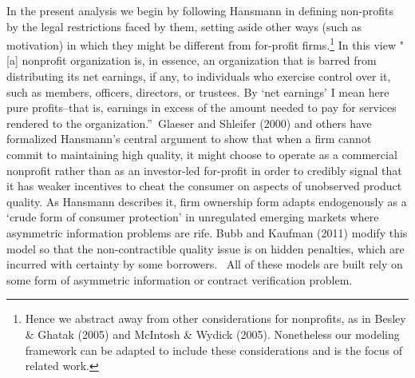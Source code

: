 \documentclass[11pt]{article}%
\begin{document}
In the present analysis we begin by following Hansmann in defining non-profits
by the legal restrictions faced by them, setting aside other ways (such as
motivation) in which they might be different from for-profit
firms.\footnote{%
Hence we abstract away from other considerations for
nonprofits, as in Besley \& Ghatak (2005) and McIntosh \& Wydick (2005).
Nonetheless our modeling framework can be adapted to include these
considerations and is the focus of related work.} In this view "[a] nonprofit
organization is, in essence, an organization that is barred from distributing
its net earnings, if any, to individuals who exercise control over it, such as
members, officers, directors, or trustees. By `net earnings' I mean here pure
profits--that is, earnings in excess of the amount needed to pay for services
rendered to the organization.\textquotedblright\ Glaeser and Shleifer (2000)
and others have formalized Hansmann's central argument to show that when a
firm cannot commit to maintaining high quality, it might choose to operate as
a commercial nonprofit rather than as an investor-led for-profit in order to
credibly signal that it has weaker incentives to cheat the consumer on aspects
of unobserved product quality. As Hansmann describes it, firm ownership form
adapts endogenously as a `crude form of consumer protection' in unregulated
emerging markets where asymmetric information problems are rife. Bubb and
Kaufman (2011) modify this model so that the non-contractible quality issue is
on hidden penalties, which are incurred with certainty by some borrowers.
\ All of these models are built rely on some form of asymmetric information or
contract verification problem.
\end{document}
